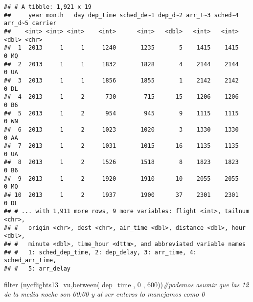 \documentclass[
]{article}
\newenvironment{Shaded}{\begin{snugshade}}{\end{snugshade}}
\newcommand{\CommentTok}[1]{\textcolor[rgb]{0.56,0.35,0.01}{\textit{#1}}}
\newcommand{\FunctionTok}[1]{\textcolor[rgb]{0.00,0.00,0.00}{#1}}
\newcommand{\NormalTok}[1]{#1}
\newcommand{\StringTok}[1]{\textcolor[rgb]{0.31,0.60,0.02}{#1}}
\begin{document}
\begin{verbatim}
## # A tibble: 1,921 x 19
##     year month   day dep_time sched_de~1 dep_d~2 arr_t~3 sched~4 arr_d~5 carrier
##    <int> <int> <int>    <int>      <int>   <dbl>   <int>   <int>   <dbl> <chr>  
##  1  2013     1     1     1240       1235       5    1415    1415       0 MQ     
##  2  2013     1     1     1832       1828       4    2144    2144       0 UA     
##  3  2013     1     1     1856       1855       1    2142    2142       0 DL     
##  4  2013     1     2      730        715      15    1206    1206       0 B6     
##  5  2013     1     2      954        945       9    1115    1115       0 WN     
##  6  2013     1     2     1023       1020       3    1330    1330       0 AA     
##  7  2013     1     2     1031       1015      16    1135    1135       0 UA     
##  8  2013     1     2     1526       1518       8    1823    1823       0 B6     
##  9  2013     1     2     1920       1910      10    2055    2055       0 MQ     
## 10  2013     1     2     1937       1900      37    2301    2301       0 DL     
## # ... with 1,911 more rows, 9 more variables: flight <int>, tailnum <chr>,
## #   origin <chr>, dest <chr>, air_time <dbl>, distance <dbl>, hour <dbl>,
## #   minute <dbl>, time_hour <dttm>, and abbreviated variable names
## #   1: sched_dep_time, 2: dep_delay, 3: arr_time, 4: sched_arr_time,
## #   5: arr_delay
\end{verbatim}

\begin{Shaded}
\begin{Highlighting}[]
\FunctionTok{filter}\NormalTok{ (nycflights13\_vu,}\FunctionTok{between}\NormalTok{( dep\_time , }\StringTok{\textquotesingle{}0\textquotesingle{}}\NormalTok{ , }\StringTok{\textquotesingle{}600\textquotesingle{}}\NormalTok{))}\CommentTok{\#podemos asumir que las 12 de la media noche son 00:00 y al ser enteros lo manejamos como 0}
\end{Highlighting}
\end{Shaded}
\end{document}
